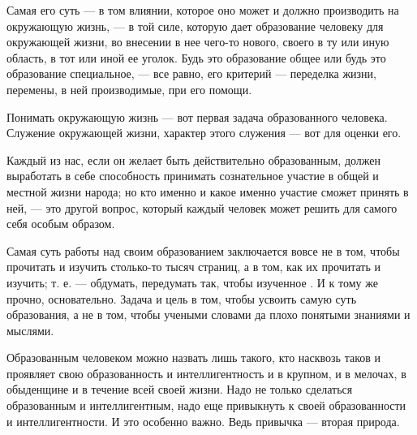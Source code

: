 Самая его суть --- в том влиянии, которое оно может и должно производить на окружающую жизнь, --- в той силе, которую дает образование человеку для  окружающей жизни, во внесении в нее чего-то нового, своего в ту или иную область, в тот или иной ее уголок. Будь это образование общее или будь это образование специальное, --- все равно, его критерий --- переделка жизни, перемены, в ней производимые, при его помощи.

Понимать окружающую жизнь --- вот первая задача образованного человека. Служение окружающей жизни, характер этого служения --- вот  для оценки его.

Каждый из нас, если он желает быть действительно образованным, должен выработать в себе способность принимать сознательное участие в общей и местной жизни народа; но кто именно и какое именно участие сможет принять в ней, --- это другой вопрос, который каждый человек может решить для самого себя особым образом.

Самая суть работы над своим образованием заключается вовсе не в том, чтобы прочитать и изучить столько-то тысяч страниц, а в том, как их прочитать и изучить; т. е. --- обдумать, передумать так, чтобы изученное . И к тому же прочно, основательно. Задача и цель в том, чтобы усвоить самую суть образования, а не в том, чтобы  учеными словами да плохо понятыми знаниями и мыслями.

Образованным человеком можно назвать лишь такого, кто насквозь таков и проявляет свою образованность и интеллигентность и в крупном, и в мелочах, в обыденщине и в течение всей своей жизни. Надо не только сделаться образованным и интеллигентным, надо еще привыкнуть к своей образованности и интеллигентности. И это особенно важно. Ведь привычка --- вторая природа.

